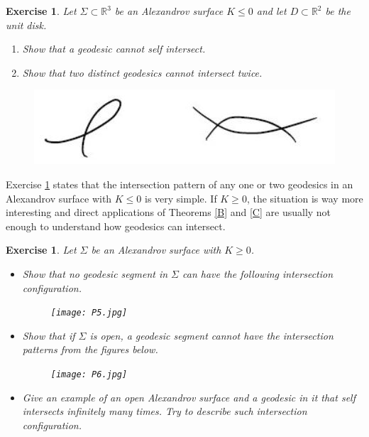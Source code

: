 \documentclass[oneside,a4paper]{amsart}
\newtheorem{exer}[thm]{Exercise}
\begin{document}
\begin{exer}\label{neg}
Let $\Sigma\subset \mathbb{R}^3$ be an Alexandrov surface $K \leq 0$ and let $D\subset \mathbb{R}^2$ be the unit disk.
\begin{enumerate}
\item  Show that a geodesic cannot self intersect.
\item  Show that two distinct geodesics cannot intersect twice.
\end{enumerate}
\end{exer}


\begin{figure}[h]
\begin{center}
\includegraphics[scale=0.7]{P4.jpg}\\
\end{center}
\end{figure}


Exercise \ref{neg} states that the intersection pattern of any one or two geodesics in an Alexandrov surface with $K \leq 0 $ is very simple. If $K \geq 0$, the situation is way more interesting and direct applications of Theorems \ref{B} and \ref{C} are usually not enough to understand how geodesics can intersect.

\begin{exer}
Let $\Sigma$ be an Alexandrov surface with $K \geq 0$. 
\begin{itemize}
\item Show that no geodesic segment in $\Sigma $ can have the following intersection configuration.

\begin{figure}[h]
\begin{center}
\texttt{[image: P5.jpg]}\\
\end{center}
\end{figure}

\item Show that if $\Sigma$ is open, a geodesic segment cannot have the intersection patterns from the figures below.

\begin{figure}[h]
\begin{center}
\texttt{[image: P6.jpg]}\\
\end{center}
\end{figure}

\item Give an example of an open Alexandrov surface and a geodesic in it that self intersects infinitely many times. Try to describe such intersection configuration.
\end{itemize}
\end{exer}
\end{document}

